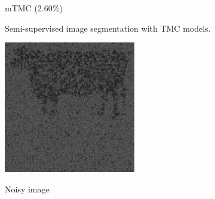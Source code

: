 \documentclass{article}
\begin{document}
\begin{figure}[htb]
\begin{minipage}[b]{0.30\linewidth}
        \centerline{mTMC (2.60\%)}\medskip
      \end{minipage}
    \caption{Semi-supervised image segmentation with TMC models. }
    \label{fig:res_camel40}
\end{figure}
 


\begin{figure}[htb]
    \begin{minipage}[b]{0.30\linewidth}
      \centering
      \centerline{\includegraphics[width=\textwidth, cfbox=black 1pt 0pt]{ress/cow40/cow40.png}}
      \centerline{Noisy image}\medskip
    \end{minipage}
    \hfill
    \begin{minipage}[b]{.30\linewidth}
      \centering

\end{minipage}
\end{figure}
\end{document}
